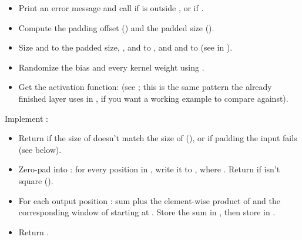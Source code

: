 \begin{itemize}
  \item Print an error message and call  if  is outside
    \code{[1, 11]}, or if .
  \item Compute the padding offset () and the padded size
    ().
  \item Size  and  to the padded size,
    ,  and  to
    , and  and  to  (see
     in ).
  \item Randomize the bias and every kernel weight using .
  \item Get the activation function:
     (see
    ; this is the same pattern the already finished  layer
    uses in , if you want a working example to compare against).
\end{itemize}

\label{c8:ex:5}
Implement :
\begin{itemize}
  \item Return  if the size of  doesn't match the size of 
    (), or if padding the input fails (see below).
  \item Zero-pad  into : for every position  in
    , write it to , where
    . Return  if  isn't square
    ().
  \item For each output position : sum  plus the element-wise product of
     and the corresponding  window of
     starting at . Store the sum in
    , then store  in
    .
  \item Return .
\end{itemize}

